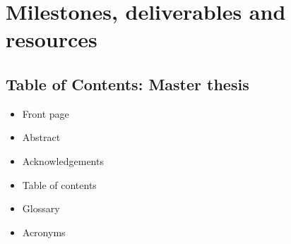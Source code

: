 \chapter{Milestones, deliverables and resources}
\label{chapter5:milestones}

\section{Table of Contents: Master thesis}
\label{chapter5:preliminary_toc}
\begin{itemize}
	\item[] Front page
	\item[] Abstract
	\item[] Acknowledgements
	\item[] Table of contents
	\item[] Glossary
	\item[] Acronyms
\end{itemize}
